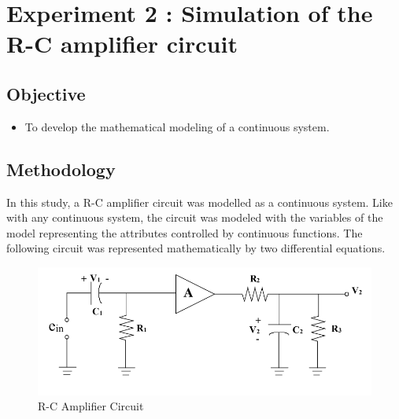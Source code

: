 \documentclass[10pt,journal,cspaper,compsoc]{IEEEtran}
\begin{document}
\section{Experiment 2 : Simulation of the R-C amplifier circuit}
  \subsection{Objective}
  \begin{itemize}
    \item To develop the mathematical modeling of a continuous system.
  \end{itemize}
  \subsection{Methodology}
  In this study, a R-C amplifier circuit was modelled as a continuous system.
  Like with any continuous system, the circuit was modeled with the
  variables of the model representing the attributes controlled by continuous functions.
  The following circuit was represented mathematically by two differential equations.
  
  \begin{figure}[!h]
    \centering
    \includegraphics[scale = 0.5]{images/circuit.PNG}
    \caption{R-C Amplifier Circuit}
  \end{figure}
\end{document}

